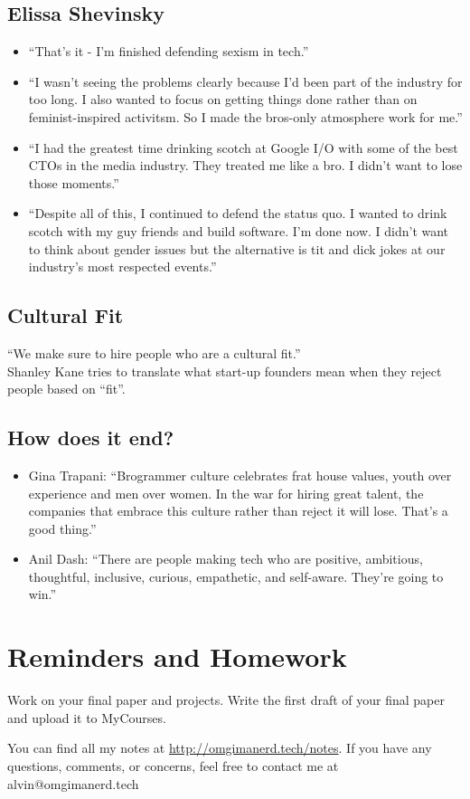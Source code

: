 \documentclass[letterpaper, 12pt]{article}
\begin{document}
\subsection*{Elissa Shevinsky}
\begin{itemize}
  \item ``That's it - I'm finished defending sexism in tech.''
  \item ``I wasn't seeing the problems clearly because I'd been part of the
    industry for too long. I also wanted to focus on getting things done
    rather than on feminist-inspired activitsm. So I made the bros-only
    atmosphere work for me.''
  \item ``I had the greatest time drinking scotch at Google I/O with some of
    the best CTOs in the media industry. They treated me like a bro. I didn't
    want to lose those moments.''
  \item ``Despite all of this, I continued to defend the status quo. I wanted
    to drink scotch with my guy friends and build software. I'm done now. I
    didn't want to think about gender issues but the alternative is tit and
    dick jokes at our industry's most respected events.''
\end{itemize}

\subsection*{Cultural Fit}
``We make sure to hire people who are a cultural fit.'' \\
Shanley Kane tries to translate what start-up founders mean when they reject
people based on ``fit''.

\subsection*{How does it end?}
\begin{itemize}
  \item Gina Trapani: ``Brogrammer culture celebrates frat house values,
    youth over experience and men over women. In the war for hiring great
    talent, the companies that embrace this culture rather than reject it will
    lose. That's a good thing.''
  \item Anil Dash: ``There are people making tech who are positive, ambitious,
    thoughtful, inclusive, curious, empathetic, and self-aware. They're going
    to win.''
\end{itemize}

\section*{Reminders and Homework}
Work on your final paper and projects. Write the first draft of your final
paper and upload it to MyCourses.

\begin{center}
  You can find all my notes at \url{http://omgimanerd.tech/notes}. If you have
  any questions, comments, or concerns, feel free to contact me at
  alvin@omgimanerd.tech
\end{center}
\end{document}
